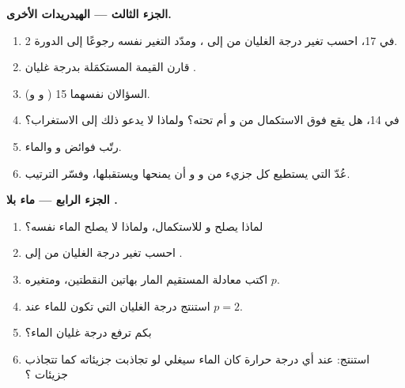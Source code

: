 \begin{problem}
\medskip
\noindent\textbf{الجزء الثالث --- الهيدريدات الأخرى.}
\begin{enumerate}[resume]
  \item في  17، احسب تغير درجة الغليان من  إلى
        ، ومدّد التغير نفسه رجوعًا إلى الدورة 2.
  \item قارن القيمة المستكمَلة بدرجة غليان .
  \item السؤالان نفسهما  15 ( و
        و).
  \item في  14، هل يقع  فوق الاستكمال
        من  و أم تحته؟ ولماذا لا يدعو ذلك إلى الاستغراب؟
  \item رتّب فوائض  و والماء.
  \item عُدّ  التي يستطيع كل جزيء من  و
        و أن يمنحها ويستقبلها، وفسّر الترتيب.
\end{enumerate}

\medskip
\noindent\textbf{الجزء الرابع --- ماء بلا .}
\begin{enumerate}[resume]
  \item لماذا يصلح  و للاستكمال،
        ولماذا لا يصلح الماء نفسه؟
  \item احسب تغير درجة الغليان من  إلى .
  \item اكتب معادلة المستقيم المار بهاتين النقطتين،
        ومتغيره  $p$.
  \item استنتج درجة الغليان التي تكون للماء عند $p = 2$.
  \item بكم ترفع  درجة غليان الماء؟
  \item استنتج: عند أي درجة حرارة كان الماء سيغلي لو تجاذبت جزيئاته
        كما تتجاذب جزيئات ؟
\end{enumerate}
\end{problem}
